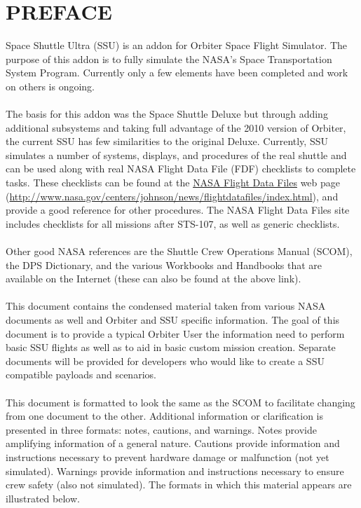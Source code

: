 \documentclass[13pt]{article}
\begin{document}
\section*{PREFACE}
\begin{multicols*}{2}
Space Shuttle Ultra (SSU) is an addon for Orbiter Space Flight Simulator.  The purpose of this addon is to fully simulate the NASA's Space Transportation System Program.  Currently only a few elements have been completed and work on others is ongoing.\\
\\
The basis for this addon was the Space Shuttle Deluxe but through adding additional subsystems and taking full advantage of the 2010 version of Orbiter, the current SSU has few similarities to the original Deluxe.  Currently, SSU simulates a number of systems, displays, and procedures of the real shuttle and can be used along with real NASA Flight Data File (FDF) checklists to complete tasks.  These checklists can be found at the \href{http://www.nasa.gov/centers/johnson/news/flightdatafiles/index.html}{NASA Flight Data Files} web page (\url{http://www.nasa.gov/centers/johnson/news/flightdatafiles/index.html}), and provide a good reference for other procedures. The NASA Flight Data Files site includes checklists for all missions after STS-107, as well as generic checklists. \\
\\
Other good NASA references are the Shuttle Crew Operations Manual (SCOM), the DPS Dictionary, and the various Workbooks and Handbooks that are available on the Internet (these can also be found at the above link). \\
\\
This document contains the condensed material taken from various NASA documents as well and Orbiter and SSU specific information.  The goal of this document is to provide a typical Orbiter User the information need to perform basic SSU flights as well as  to aid in basic custom mission creation.  Separate documents will be provided for developers who would like to create a SSU compatible payloads and scenarios.\\
\\
This document is formatted to look the same as the SCOM to facilitate changing from one document to the other.  Additional information or clarification is presented in three formats: notes, cautions, and warnings. Notes provide amplifying information of a general nature. Cautions provide information and instructions necessary to prevent hardware damage or malfunction (not yet simulated). Warnings provide information and instructions necessary to ensure crew safety (also not simulated). The formats in which this material appears are illustrated below.\\

\end{multicols*}
\end{document}
